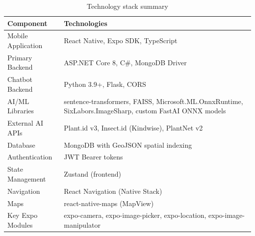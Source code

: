\begin{table}[H]
\centering
\caption{Technology stack summary}
\label{tab:tech_stack}
\begin{tabularx}{\textwidth}{|l|X|}
\hline
\textbf{Component} & \textbf{Technologies} \\
\hline
Mobile Application & React Native, Expo SDK, TypeScript \\
\hline
Primary Backend & ASP.NET Core 8, C\#, MongoDB Driver \\
\hline
Chatbot Backend & Python 3.9+, Flask, CORS \\
\hline
AI/ML Libraries & sentence-transformers, FAISS, Microsoft.ML.OnnxRuntime, SixLabors.ImageSharp, custom FastAI ONNX models \\
\hline
External AI APIs & Plant.id v3, Insect.id (Kindwise), PlantNet v2 \\
\hline
Database & MongoDB with GeoJSON spatial indexing \\
\hline
Authentication & JWT Bearer tokens \\
\hline
State Management & Zustand (frontend) \\
\hline
Navigation & React Navigation (Native Stack) \\
\hline
Maps & react-native-maps (MapView) \\
\hline
Key Expo Modules & expo-camera, expo-image-picker, expo-location, expo-image-manipulator \\
\hline
\end{tabularx}
\end{table}

\newpage
